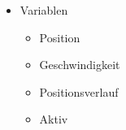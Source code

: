 \begin{itemize}
	\item Variablen
	\begin{itemize}
		\item Position
		\item Geschwindigkeit
		\item Positionsverlauf
		\item Aktiv
	\end{itemize}
\end{itemize}